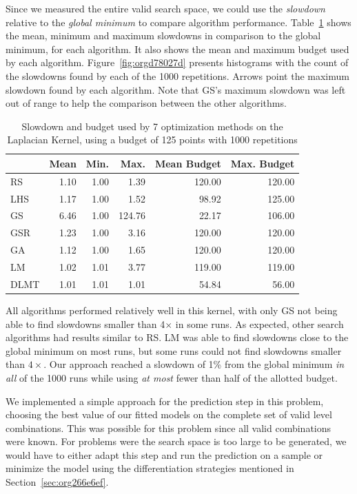 \documentclass[conference]{IEEEtran}
\begin{document}
Since we measured the entire valid search space, we could use the \emph{slowdown}
relative to the \emph{global minimum} to compare algorithm performance.
Table~\ref{tab:gpu_laplacian_compare_budget} shows the mean, minimum and
maximum slowdowns in comparison to the global minimum, for each algorithm. It
also shows the mean and maximum budget used by each algorithm.
Figure~\ref{fig:orgd78027d} presents histograms with the
count of the slowdowns found by each of the 1000 repetitions. Arrows point the
maximum slowdown found by each algorithm. Note that GS's maximum slowdown was
left out of range to help the comparison between the other algorithms.

\begin{table}[b]
\centering
\caption{Slowdown and budget used by 7 optimization methods on the Laplacian Kernel, using a budget of 125 points with 1000 repetitions}
\label{tab:gpu_laplacian_compare_budget}
\begingroup\footnotesize
\begin{tabular}{lrrrrr}
  \toprule
 & Mean & Min. & Max. & Mean Budget & Max. Budget \\
  \midrule
RS & 1.10 & 1.00 & 1.39 & 120.00 & 120.00 \\
  LHS & 1.17 & 1.00 & 1.52 & 98.92 & 125.00 \\
  GS & 6.46 & 1.00 & 124.76 & 22.17 & 106.00 \\
  GSR & 1.23 & 1.00 & 3.16 & 120.00 & 120.00 \\
  GA & 1.12 & 1.00 & 1.65 & 120.00 & 120.00 \\
  LM & 1.02 & 1.01 & 3.77 & 119.00 & 119.00 \\
   \rowcolor{red!25}DLMT & 1.01 & 1.01 & 1.01 & 54.84 & 56.00 \\
   \bottomrule
\end{tabular}
\endgroup
\end{table}

All algorithms performed relatively well in this kernel, with only GS not being
able to find slowdowns smaller than 4\(\times\) in some runs. As expected, other
search algorithms had results similar to RS. LM was able to find slowdowns close
to the global minimum on most runs, but some runs could not find slowdowns
smaller than \(4\times\). Our approach reached a slowdown of 1\% from the global
minimum \emph{in all} of the 1000 runs while using \emph{at most} fewer than half of the
allotted budget.

We implemented a simple approach for the prediction step in this problem,
choosing the best value of our fitted models on the complete set of valid level
combinations. This was possible for this problem since all valid combinations
were known. For problems were the search space is too large to be generated, we
would have to either adapt this step and run the prediction on a sample or
minimize the model using the differentiation strategies mentioned in
Section~\ref{sec:org266e6ef}.
\end{document}
